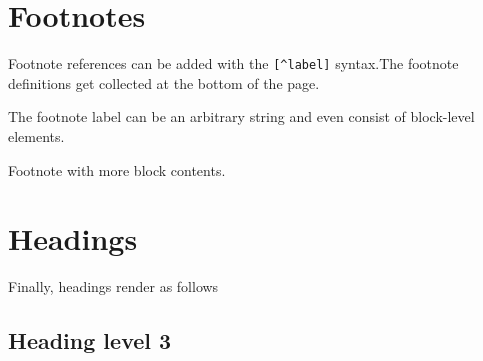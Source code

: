 \section{Footnotes}



\label{16845496644619434430}{}


Footnote references can be added with the \texttt{[{\textasciicircum}label]} syntax.\footnotemark[1] The footnote definitions get collected at the bottom of the page.



The footnote label can be an arbitrary string and even consist of block-level elements.\footnotemark[2]







Footnote with more block contents.\footnotemark[3]





\section{Headings}



\label{5680510222270408269}{}


Finally, headings render as follows



\subsection{Heading level 3}



